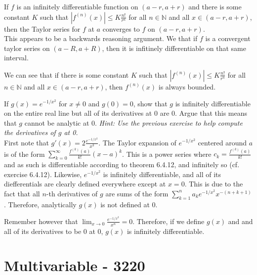 \documentclass[12pt]{book}
\newcommand{\N}{\mathbb{N}}
\newenvironment{exercise}[2][Exercise]{\begin{trivlist}
\item[\hskip \labelsep {\bfseries #1}\hskip \labelsep {\bfseries #2.}]}{\end{trivlist}}
\begin{document}
\begin{exercise}{6.5.11}
If $f$ is an infinitely differentiable function on $(a-r,a+r)$ and there is some constant $K$ such that $\left| f^{(n)} (x)\right| \leq K \frac{n!}{r^n}$ for all $n \in \N$ and all $x \in (a-r,a+r)$, then the Taylor series for $f$ at $a$ converges to $f$ on $(a-r,a+r)$. \\

This appears to be a backwards reasoning argument. We that if $f$ is a convergent taylor series on $\left(a-R, a+R\right)$, then it is infitinely differentiable on that same interval.

We can see that if there is some constant $K$ such that $\left| f^{(n)} (x)\right| \leq K \frac{n!}{r^n}$ for all $n \in \N$ and all $x \in (a-r,a+r)$, then $f^{(n)}(x)$ is always bounded.
\end{exercise}



\begin{exercise}{6.5.13}
If $g(x)=e^{-1/x^2}$ for $x \neq 0$ and $g(0)=0$, show that $g$ is infinitely differentiable on the entire real line but all of its derivatives at 0 are 0. Argue that this means that $g$ cannot be analytic at 0. \emph{Hint: Use the previous exercise to help compute the derivatives of $g$ at 0.} \\

First note that $g'(x)= 2 \frac{e^{-1/x^2}}{x^3}$. The Taylor expansion of $e^{-1/x^2}$ centered around $a$ is of the form $\sum_{k=0}^\infty \frac{f^{(k)}(a)}{k!} \left(x-a\right)^k$. This is a power series where $c_k=\frac{f^{(k)}(a)}{k!}$ and as such is differentiable according to theorem 6.4.12, and infinitely so (cf. exercise 6.4.12). Likewise, $e^{-1/x^2}$ is infinitely differentiable, and all of its diefferentials are clearly defined everywhere except at $x=0$. This is due to the fact that all $n$-th derivatives of $g$ are sums of the form $\sum_{k=1}^n a_k e^{-1/x^2} x^{-(n+k+1)}$. Therefore, analytically $g(x)$ is not defined at 0.

Remember however that $\lim_{x \to 0} \frac{e^{-1/x^2}}{x^n}=0$. Therefore, if we define $g(x)$ and and all of its derivatives to be 0 at 0, $g(x)$ is infinitely differentiable.
\end{exercise}



\part{Multivariable - 3220}
\end{document}
